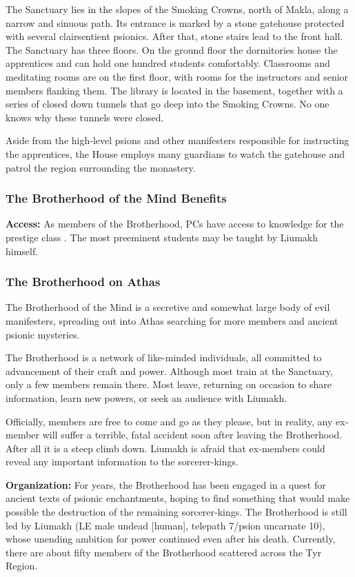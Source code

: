 The Sanctuary lies in the slopes of the Smoking Crowns, north of Makla, along a narrow and sinuous path. Its entrance is marked by a stone gatehouse protected with several clairsentient psionics. After that, stone stairs lead to the front hall. The Sanctuary has three floors. On the ground floor the dormitories house the apprentices and can hold one hundred students comfortably. Classrooms and meditating rooms are on the first floor, with rooms for the instructors and senior members flanking them. The library is located in the basement, together with a series of closed down tunnels that go deep into the Smoking Crowns. No one knows why these tunnels were closed.

Aside from the high‐level psions and other manifesters responsible for instructing the apprentices, the House employs many guardians to watch the gatehouse and patrol the region surrounding the monastery.

\subsubsection{The Brotherhood of the Mind Benefits}
\textbf{Access:} As members of the Brotherhood, PCs have access to knowledge for the prestige class . The most preeminent students may be taught by Liumakh himself.

\subsubsection{The Brotherhood on Athas}
The Brotherhood of the Mind is a secretive and somewhat large body of evil manifesters, spreading out into Athas searching for more members and ancient psionic mysteries.

The Brotherhood is a network of like-minded individuals, all committed to advancement of their craft and power. Although most train at the Sanctuary, only a few members remain there. Most leave, returning on occasion to share information, learn new powers, or seek an audience with Liumakh.

Officially, members are free to come and go as they please, but in reality, any ex‐member will suffer a terrible, fatal accident soon after leaving the Brotherhood. After all it is a steep climb down. Liumakh is afraid that ex‐members could reveal any important information to the sorcerer‐kings.

\textbf{Organization:} For years, the Brotherhood has been engaged in a quest for ancient texts of psionic enchantments, hoping to find something that would make possible the destruction of the remaining sorcerer‐kings. The Brotherhood is still led by Liumakh (LE male undead [human], telepath 7/psion uncarnate 10), whose unending ambition for power continued even after his death. Currently, there are about fifty members of the Brotherhood scattered across the Tyr Region.

